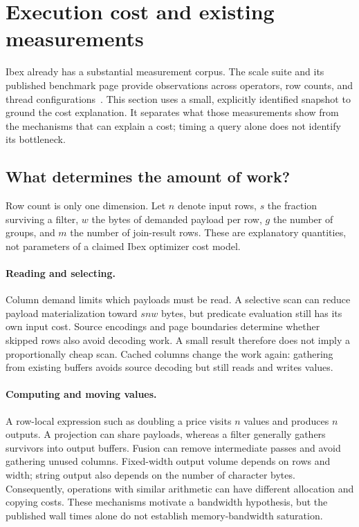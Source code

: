 \section{Execution cost and existing measurements}
\label{sec:cost}
Ibex already has a substantial measurement corpus. The scale suite and its
published benchmark page provide observations across operators, row counts,
and thread configurations~\cite{ibexBenchmarks}. This section uses a small,
explicitly identified snapshot to ground the cost explanation. It separates
what those measurements show from the mechanisms that can explain a cost;
timing a query alone does not identify its bottleneck.

\subsection{What determines the amount of work?}
Row count is only one dimension. Let $n$ denote input rows, $s$ the fraction
surviving a filter, $w$ the bytes of demanded payload per row, $g$ the number
of groups, and $m$ the number of join-result rows. These are explanatory
quantities, not parameters of a claimed Ibex optimizer cost model.

\paragraph{Reading and selecting.}
Column demand limits which payloads must be read. A selective scan can reduce
payload materialization toward $snw$ bytes, but predicate evaluation still
has its own input cost. Source encodings and page boundaries determine whether
skipped rows also avoid decoding work. A small result therefore does not imply
a proportionally cheap scan. Cached columns change the work again: gathering
from existing buffers avoids source decoding but still reads and writes values.

\paragraph{Computing and moving values.}
A row-local expression such as doubling a price visits $n$ values and produces
$n$ outputs. A projection can share payloads, whereas a filter generally gathers
survivors into output buffers. Fusion can remove intermediate passes and avoid
gathering unused columns. Fixed-width output volume depends on rows and width;
string output also depends on the number of character bytes. Consequently,
operations with similar arithmetic can have different allocation and copying
costs. These mechanisms motivate a bandwidth hypothesis, but the published
wall times alone do not establish memory-bandwidth saturation.

